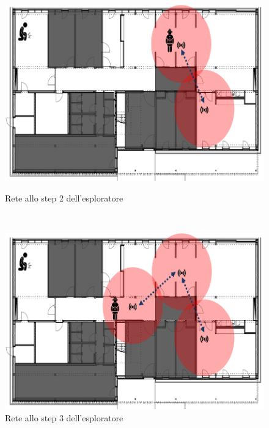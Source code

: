 \begin{figure}[h]
	\begin{minipage}[b]{6cm}
		\centering
		\includegraphics[scale=0.35]{Introduzione/intervento_step_2.png}
		\caption{Rete allo step 2 dell'esploratore}
		\label{fig:step2}
	\end{minipage}
	\ \hspace{10 mm} \
	\begin{minipage}[b]{6cm}
		\centering
		\includegraphics[scale=0.35]{Introduzione/intervento_step_3.png}
		\caption{Rete allo step 3 dell'esploratore}
		\label{fig:step3}
	\end{minipage}
\end{figure}

